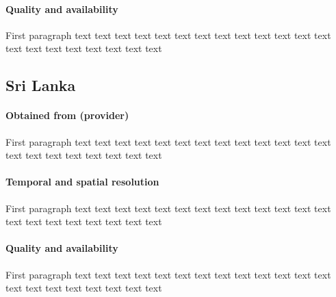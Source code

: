 \documentclass[twocolumn, 10pt, a4paper]{memoir}
\begin{document}
		\paragraph{Quality and availability}
		First paragraph 
		text text text text text text text text text text text text text text text text text text text text text
	\subsection{Sri Lanka}
		\paragraph{Obtained from (provider)}
		First paragraph 
		text text text text text text text text text text text text text text text text text text text text text
		\paragraph{Temporal and spatial resolution}
		First paragraph 
		text text text text text text text text text text text text text text text text text text text text text
		\paragraph{Quality and availability}
		First paragraph 
		text text text text text text text text text text text text text text text text text text text text text
\end{document}
